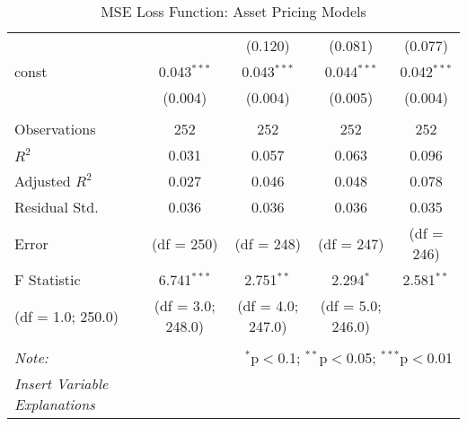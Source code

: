 \begin{table}[H]
\begin{tabular}{@{\extracolsep{5pt}}lcccc}
                      &                                                                                  & (0.120)           & (0.081)           & (0.077)       \\
    const             & 0.043$^{***}$                                                                    & 0.043$^{***}$     & 0.044$^{***}$     & 0.042$^{***}$ \\
                      & (0.004)                                                                          & (0.004)           & (0.005)           & (0.004)       \\
    \hline                                                                                                                                                       \\[-1.8ex]
    Observations      & 252                                                                              & 252               & 252               & 252           \\
    $R^2$             & 0.031                                                                            & 0.057             & 0.063             & 0.096         \\
    Adjusted $R^2$    & 0.027                                                                            & 0.046             & 0.048             & 0.078         \\
    Residual Std.     & 0.036                                                                            & 0.036             & 0.036             & 0.035         \\
    Error             & (df = 250)                                                                       & (df = 248)        & (df = 247)        & (df = 246)    \\
    F Statistic       & 6.741$^{***}$                                                                    & 2.751$^{**}$      & 2.294$^{*}$       & 2.581$^{**}$  \\
    (df = 1.0; 250.0) & (df = 3.0; 248.0)                                                                & (df = 4.0; 247.0) & (df = 5.0; 246.0)                 \\
    \hline
    \hline                                                                                                                                                       \\[-1.8ex]
    \textit{Note:}    & \multicolumn{4}{r}{$^{*}$p$<$0.1; $^{**}$p$<$0.05; $^{***}$p$<$0.01}                                                                     \\
    \textit{Insert Variable Explanations}                                                                                                                        \\
  \end{tabular}
  \caption{MSE Loss Function: Asset Pricing Models}
  \label{mse-tf-apm}
\end{table}





